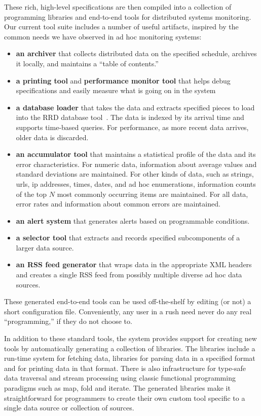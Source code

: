 These rich, high-level specifications are then compiled into a
collection of programming libraries and end-to-end tools for
distributed systems monitoring.  Our current tool suite includes a
number of useful artifacts, inspired by the common needs we have
observed in ad hoc monitoring systems:

\begin{itemize}
\item {\bf an archiver} that collects distributed data on the specified 
schedule, archives it locally, and maintains a ``table of contents.''
\item {\bf a printing tool} and {\bf performance monitor tool} that helps
debug specifications and easily measure what is going on in the system
\item {\bf a database loader} that takes the data and extracts specified 
pieces to load into the RRD database tool~\cite{rrdtool}.  The data is 
indexed by its arrival time and supports time-based queries.  For 
performance, as more recent data arrives, older data is discarded.
\item {\bf an accumulator tool} that maintains a statistical profile of the 
data and its error characteristics.  For numeric data, information about 
average values and standard deviations are maintained.  For other kinds 
of data, such as strings, urls, ip addresses, times, dates, and ad hoc 
enumerations, information counts of the top $N$ most commonly occurring 
items are maintained.  For all data, error rates and information about 
common errors are maintained.
\item {\bf an alert system} that generates alerts based on programmable 
conditions.
\item {\bf a selector tool} that extracts and records specified 
subcomponents of a larger data source.
\item {\bf an RSS feed generator} that wraps data in the appropriate 
XML headers and creates a single RSS feed from possibly multiple diverse 
ad hoc data sources.
\end{itemize}

These generated end-to-end tools can
be used off-the-shelf by editing (or not) a short configuration file.
Conveniently, any user in a rush need never do any real ``programming,''
if they do not choose to.  

In addition to these standard tools, the system provides support for
creating new tools by automatically generating a collection of
libraries.  The libraries include a run-time system for fetching data,
libraries for parsing data in a specified format and for printing data
in that format.  There is also infrastructure for type-safe data
traversal and stream processing using classic functional programming
paradigms such as map, fold and iterate.  The generated libraries make
it straightforward for programmers to create their own custom tool
specific to a single data source or collection of sources.  

